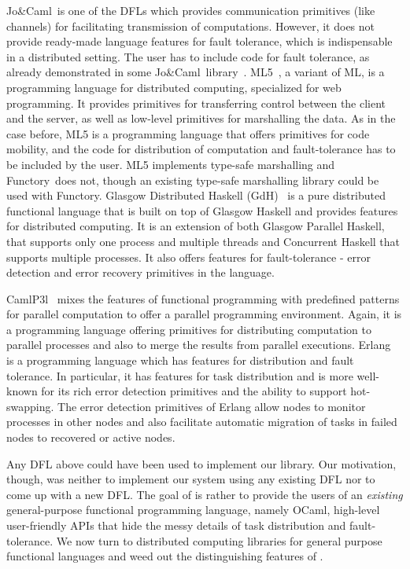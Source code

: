 \documentclass{llncs}
\newcommand{\Ocaml}{OCaml}
\newcommand{\functory}{\textsf{Functory}}
\newcommand{\JoCaml}{Jo{\&\!}Caml}
\begin{document}
\JoCaml\ is one of the DFLs which provides communication primitives
(like channels) for facilitating transmission of
computations. However, it does not provide ready-made language
features for fault tolerance, which is indispensable in a distributed
setting. The user has to include code for fault tolerance, as already
demonstrated in some \JoCaml\
library~\cite{mandel2008}. ML5~\cite{ML5}, a variant of ML, is a
programming language for distributed computing, specialized for web
programming. It provides primitives for transferring control between
the client and the server, as well as low-level primitives for
marshalling the data. As in the case before, ML5 is a programming
language that offers primitives for code mobility, and the code for
distribution of computation and fault-tolerance has to be included by
the user.  ML5 implements type-safe marshalling and
\functory\ does not, though an existing type-safe marshalling library
could be used with \functory. 
Glasgow Distributed Haskell (GdH)~\cite{GdH} is a pure distributed
functional language that is built on top of Glasgow Haskell and
provides features for distributed computing. It is an extension of
both Glasgow Parallel Haskell, that supports only one process and
multiple threads and Concurrent Haskell that supports multiple
processes. It also offers features for fault-tolerance - error
detection and error recovery primitives in the
language. 

CamlP3l~\cite{camlP3l} mixes the features of functional programming
with predefined patterns for parallel computation to offer a parallel
programming environment. Again, it is a programming language offering
primitives for distributing computation to parallel processes and also
to merge the results from parallel executions. Erlang~\cite{erlang} is
a programming language which has features for distribution and fault
tolerance. In particular, it has features for task distribution and is
more well-known for its rich error detection primitives and the
ability to support hot-swapping. The error detection primitives of
Erlang allow nodes to monitor processes in other nodes and also
facilitate automatic migration of tasks in failed nodes to recovered
or active nodes.

Any DFL above could have been used to implement our library. 
Our motivation, though, was neither to implement our system using any
existing DFL nor to come up with a new DFL.
The goal of  is rather to provide the
users of an \emph{existing} general-purpose functional programming
language, namely \Ocaml, high-level 
user-friendly APIs that hide the messy details of task distribution
and fault-tolerance.
We now turn to distributed computing libraries for general purpose
functional languages and weed out the distinguishing features of
\of{Functory}.
\end{document}
